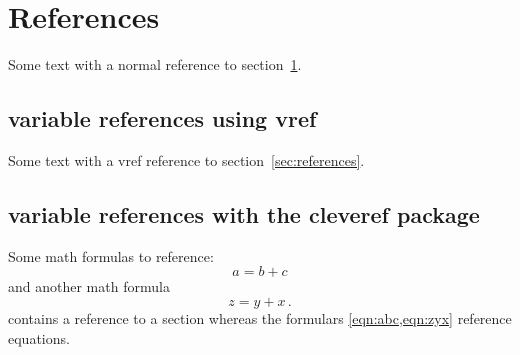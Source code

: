 %

%
\section{References}
\label{sec:references}

\begin{filecontents*}{\democodefile}
Some text with a normal reference 
to section~\ref{sec:references}.
\end{filecontents*}

%

\subsection{variable references using vref}

\begin{filecontents*}{\democodefile}
Some text with a vref reference 
to section~\vref{sec:references}.
\end{filecontents*}

%

\subsection{variable references with the cleveref package}

\begin{filecontents*}{\democodefile}
Some math formulas to reference:
\begin{equation}
a = b + c \label{eqn:abc}
\end{equation}
and another math formula
\begin{equation}
z = y + x\,. \label{eqn:zyx}
\end{equation}
 contains a reference to a section
whereas the formulars \cref{eqn:abc,eqn:zyx} 
reference equations.
\end{filecontents*}

